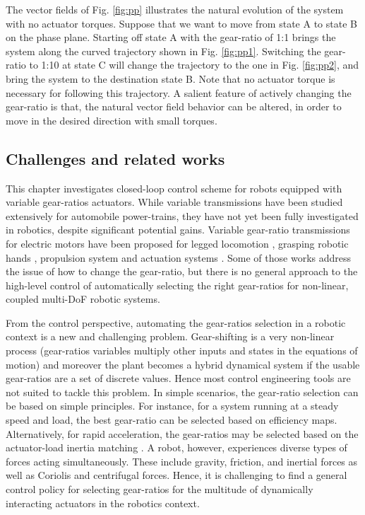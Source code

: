 The vector fields of Fig. \ref{fig:pp} illustrates the natural evolution of the system with no actuator torques. Suppose that we want to move from state A to state B on the phase plane. Starting off state A with the gear-ratio of 1:1 brings the system along the curved trajectory shown in Fig. \ref{fig:pp1}. Switching the gear-ratio to 1:10 at state C will change the trajectory to the one in Fig. \ref{fig:pp2}, and bring the system to the destination state B. Note that no actuator torque is necessary for following this trajectory. A salient feature of actively changing the gear-ratio is that, the natural vector field behavior can be altered, in order to move in the desired direction with small torques.



\subsection{Challenges and related works}
\label{sec:chal}

This chapter investigates closed-loop control scheme for robots equipped with variable gear-ratios actuators. While variable transmissions have been studied extensively for automobile power-trains, they have not yet been fully investigated in robotics, despite significant potential gains. Variable gear-ratio transmissions for electric motors have been proposed for legged locomotion \cite{hirose_design_1991}, grasping robotic hands \cite{shin_robot_2012} , propulsion system \cite{lee_new_2012} \cite{mckeegan_antonovs_2011} and actuation systems \cite{girard_two-speed_2015} \cite{hirose_development_1999} \cite{tahara_high-backdrivable_2011}. Some of those works address the issue of how to change the gear-ratio, but there is no general approach to the high-level control of automatically selecting the right gear-ratios for non-linear, coupled multi-DoF robotic systems.

From the control perspective, automating the gear-ratios selection in a robotic context is a new and challenging problem. Gear-shifting is a very non-linear process (gear-ratios variables multiply other inputs and states in the equations of motion) and moreover the plant becomes a hybrid dynamical system if the usable gear-ratios are a set of discrete values. Hence most control engineering tools are not suited to tackle this problem. In simple scenarios, the gear-ratio selection can be based on simple principles. For instance, for a system running at a steady speed and load, the best gear-ratio can be selected based on efficiency maps. Alternatively, for rapid acceleration, the gear-ratios may be selected based on the actuator-load inertia matching \cite{giberti_effects_2010} \cite{chen_generalized_1991}. A robot, however, experiences diverse types of forces acting simultaneously. These include gravity, friction, and inertial forces as well as Coriolis and centrifugal forces. Hence, it is challenging to find a general control policy for selecting gear-ratios for the multitude of dynamically interacting actuators in the robotics context. 

